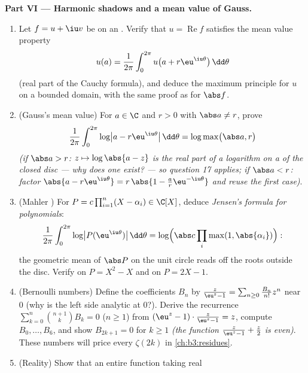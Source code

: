 \begin{problem}
\medskip
\noindent\textbf{Part VI --- Harmonic shadows and a mean
value of Gauss.}
\begin{enumerate}[resume]
  \item Let $f = u + \iu v$ be  on an .
        Verify that $u = \operatorname{Re}f$ satisfies the
        mean value property
        \[
        u(a) = \frac1{2\pi}\int_0^{2\pi}
        u\bigl(a + r\eu^{\iu\theta}\bigr)\,\dd\theta
        \]
        (real part of the Cauchy formula), and deduce the
        maximum principle for $u$ on a bounded domain, with
        the same  proof as for $\abs f$.
  \item (Gauss's mean value) For $a \in \C$ and $r > 0$ with
        $\abs a \neq r$, prove
        \[
        \frac1{2\pi}\int_0^{2\pi}
        \log\bigl|a - r\eu^{\iu\theta}\bigr|\,\dd\theta
        = \log\max\bigl(\abs a, r\bigr)
        \]
        \emph{(if $\abs a > r$: $z \mapsto \log\abs{a - z}$
        is the real part of a  logarithm on a
         of the closed disc --- why does one
        exist? --- so question 17 applies; if $\abs a < r$:
        factor $\abs{a - r\eu^{\iu\theta}} = r\,\abs{1 -
        \frac ar\eu^{-\iu\theta}}$ and reuse the first
        case)}.
  \item (Mahler ) For $P = c\prod_{i=1}^n(X -
        \alpha_i) \in \C[X]$, deduce \emph{Jensen's formula
        for polynomials}:
        \[
        \frac1{2\pi}\int_0^{2\pi}\log\bigl|P(\eu^{\iu\theta})
        \bigr|\,\dd\theta
        = \log\Bigl(\abs c\prod_{i}\max(1,
        \abs{\alpha_i})\Bigr) :
        \]
        the geometric mean of $\abs P$ on the unit circle
        reads off the roots outside the disc. Verify on $P =
        X^2 - X$ and on $P = 2X - 1$.
  \item (Bernoulli numbers) Define the coefficients $B_n$ by
        $\frac{z}{\eu^z - 1} = \sum_{n\geq0}\frac{B_n}{n!}
        z^n$ near $0$ (why is the left side analytic at
        $0$?). Derive the recurrence
        $\sum_{k=0}^{n}\binom{n+1}kB_k = 0$ ($n \geq 1$) from
        $(\eu^z - 1)\cdot\frac z{\eu^z-1} = z$, compute $B_0,
        \dots, B_6$, and show $B_{2k+1} = 0$ for $k \geq 1$
        \emph{(the function $\frac z{\eu^z-1} + \frac z2$ is
        even)}. These numbers will price every $\zeta(2k)$ in
        \cref{ch:b3:residues}.
  \item (Reality) Show that an entire function taking real

\end{enumerate}
\end{problem}

